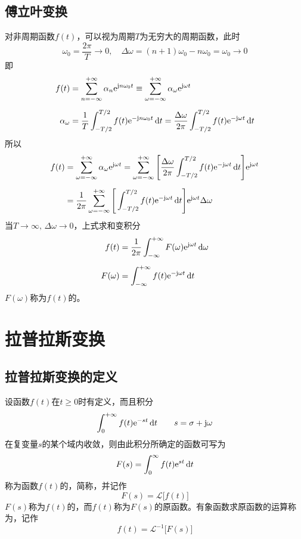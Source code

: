 \subsection{傅立叶变换}
\tdefination[傅立叶变换]
对非周期函数$f(t)$，可以视为周期$T$为无穷大的周期函数，此时
\[
\omega_0 = \dfrac{2\pi}{T} \to 0,\quad \Delta \omega = (n+1)\omega_0 - n \omega_0 = \omega_0 \to 0
\]
即
\begin{align}
	f(t) &= \sum_{n = -\infty}^{+\infty} \alpha_n {\rm{e}}^{\text{j} n \omega_0 t} \equiv  \sum_{\omega = -\infty}^{+\infty} \alpha_\omega {\rm{e}}^{\text{j} \omega t}\\[0.5em]
	\alpha_\omega &= \dfrac{1}{T} \int_{-T/2}^{T/2} f(t){\rm{e}}^{-\text{j} n \omega_0 t}\, {\rm{d}} t = \dfrac{\Delta \omega}{2 \pi}\int_{-T/2}^{T/2}f(t){\rm{e}}^{-\text{j}\omega t}\, {\rm{d}} t
\end{align}
所以
\begin{align*}
	f(t) & =  \sum_{\omega = -\infty}^{+\infty} \alpha_\omega {\rm{e}}^{\text{j} \omega t} =  \sum_{\omega = -\infty}^{+\infty}\Bigg[ \dfrac{\Delta \omega}{2 \pi}\int_{-T/2}^{T/2}f(t){\rm{e}}^{-\text{j}\omega t}\, {\rm{d}} t\Bigg]{\rm{e}}^{\text{j} \omega t}\\[0.5em]
	& = \dfrac{1}{2\pi}\sum_{\omega = -\infty}^{+\infty}\Bigg[\int_{-T/2}^{T/2}f(t){\rm{e}}^{-\text{j}\omega t}\, {\rm{d}} t\Bigg]{\rm{e}}^{\text{j} \omega t}\Delta \omega
\end{align*}
当$T\to \infty,\,\Delta \omega \to 0$，上式求和变积分
\begin{align}
	f(t) &= \dfrac{1}{2\pi}\int_{-\infty}^{+\infty} F(\omega){\rm{e}}^{\text{j}\omega t}\, {\rm{d}} \omega\\[0.5em]
	F(\omega) & = \int_{-\infty}^{+\infty}f(t){\rm{e}}^{-\text{j} \omega t}\, {\rm{d}} t
\end{align}
$F(\omega)$称为$f(t)$的。


\section{拉普拉斯变换}
\subsection{拉普拉斯变换的定义}
\tdefination[拉普拉斯变换]
设函数$f(t)$在$t \ge 0$时有定义，而且积分
\begin{equation*}
	\int_{0}^{+\infty} f(t){\rm{e}}^{-st}\,{\rm{d}} t \quad\quad s = \sigma+\text{j} \omega
\end{equation*}
在复变量$s$的某个域内收敛，则由此积分所确定的函数可写为
\begin{equation}
	F(s) = \int_{0}^{\infty}f(t){\rm{e}}^{st}\,{\rm{d}} t
\end{equation}
称为函数$f(t)$的，简称，并记作
\begin{equation*}
	F(s) = \mathcal{L}\big[f(t)\big]
\end{equation*}
$F(s)$称为$f(t)$的，而$f(t)$称为$F(s)$的原函数。有象函数求原函数的运算称为，记作
\begin{equation*}
	f(t) = \mathcal{L}^{-1}\big[F(s)\big]
\end{equation*}

